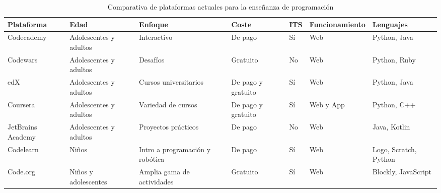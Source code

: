 \begin{table}[h]
    \centering

    \begin{tabulary}{1.2\textwidth}{|L|L|L|L|L|L|L|}
        \toprule
        \textbf{Plataforma} & \textbf{Edad} & \textbf{Enfoque} & \textbf{Coste} & \textbf{ITS} & \textbf{Funcionamiento} & \textbf{Lenguajes} \\
        \midrule
        Codecademy & Adolescentes y adultos & Interactivo & De pago & Sí & Web & Python, Java \\
        \midrule
        Codewars & Adolescentes y adultos & Desafíos & Gratuito & No & Web & Python, Ruby \\
        \midrule
        edX & Adolescentes y adultos & Cursos universitarios & De pago y gratuito & Sí & Web & Python, Java \\
        \midrule
        Coursera & Adolescentes y adultos & Variedad de cursos & De pago y gratuito & Sí & Web y App & Python, C++ \\
        \midrule
        JetBrains Academy & Adolescentes y adultos & Proyectos prácticos & De pago & No & Web & Java, Kotlin \\
        \midrule
        Codelearn & Niños & Intro a programación y robótica & De pago & Sí & Web & Logo, Scratch, Python \\
        \midrule
        Code.org & Niños y adolescentes & Amplia gama de actividades & Gratuito & Sí & Web & Blockly, JavaScript \\
        \bottomrule
    \end{tabulary}
    
    \caption{Comparativa de plataformas actuales para la enseñanza de programación}
    \label{tab:comparativa}
\end{table}